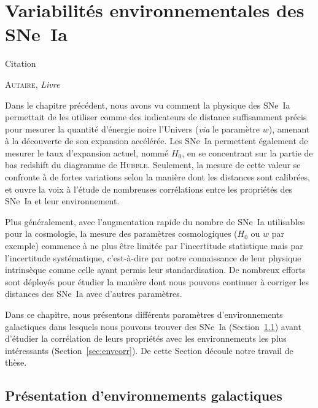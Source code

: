 \documentclass[../main/main.tex]{subfiles}
\begin{document}
\dominitoc
\faketableofcontents
\dominilof
\fakelistoffigures
\dominilot
\fakelistoftables

\chapter{Variabilit\'es environnementales des SNe~Ia}\label{ch:env}
\epigraph{\openquote Citation\closequote}{\textsc{Autaire}, \textit{Livre}}

Dans le chapitre précédent, nous avons vu comment la physique des SNe~Ia
permettait de les utiliser comme des indicateurs de distance suffisamment précis
pour mesurer la quantité d'énergie noire l'Univers (\textit{via} le paramètre
$w$), amenant à la découverte de son expansion accélérée. Les SNe~Ia permettent
également de mesurer le taux d'expansion actuel, nommé $H_0$, en se concentrant
sur la partie de bas redshift du diagramme de \textsc{Hubble}. Seulement, la
mesure de cette valeur se confronte à de fortes variations selon la manière dont
les distances sont calibrées, et ouvre la voix à l'étude de nombreuses
corrélations entre les propriétés des SNe~Ia et leur environnement.

Plus généralement, avec l'augmentation rapide du nombre de SNe~Ia utilisables
pour la cosmologie, la mesure des paramètres cosmologiques ($H_0$ ou $w$ par
exemple) commence à ne plus être limitée par l'incertitude statistique mais par
l'incertitude systématique, c'est-à-dire par notre connaissance de leur physique
intrinsèque comme celle ayant permis leur standardisation. De nombreux efforts
sont déployés pour étudier la manière dont nous pouvons continuer à corriger les
distances des SNe~Ia avec d'autres paramètres.

Dans ce chapitre, nous présentons différents paramètres d'environnements
galactiques dans lesquels nous pouvons trouver des SNe~Ia
(Section~\ref{sec:envpres}) avant d'étudier la corrélation de leurs propriétés
avec les environnements les plus intéressants (Section~\ref{sec:envcorr}). De
cette Section découle notre travail de thèse.

\vfill
\minitoc
\vfill
\newpage

\section{Présentation d'environnements galactiques}\label{sec:envpres}
\end{document}
